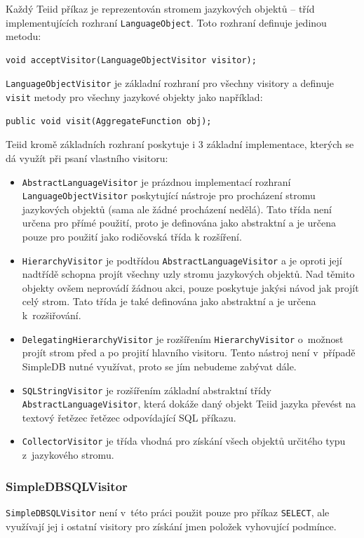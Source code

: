 \documentclass[oneside,12pt]{fithesis2}
\begin{document}
Každý Teiid příkaz je reprezentován stromem jazykových objektů -- tříd implementujících rozhraní \texttt{LanguageObject}. Toto rozhraní definuje jedinou metodu: 
\begin{Verbatim}[fontsize=\small]
void acceptVisitor(LanguageObjectVisitor visitor);
\end{Verbatim}
\texttt{LanguageObjectVisitor} je základní rozhraní pro všechny visitory a definuje \texttt{visit} metody pro všechny jazykové objekty jako například:
\begin{Verbatim}[fontsize=\small]
public void visit(AggregateFunction obj);
\end{Verbatim}
Teiid kromě základních rozhraní poskytuje i 3 základní implementace, kterých se dá využít při psaní vlastního visitoru:
\begin{itemize}
 \item \texttt{AbstractLanguageVisitor} je prázdnou implementací rozhraní \texttt{Language\allowbreak ObjectVisitor} poskytující nástroje pro procházení stromu jazykových objektů (sama ale žádné procházení nedělá). Tato třída není určena pro přímé použití, proto je definována jako abstraktní a je určena pouze pro použití jako rodičovská třída k rozšíření.
 \item \texttt{HierarchyVisitor} je podtřídou \texttt{AbstractLanguageVisitor} a je oproti její nadtřídě schopna projít všechny uzly stromu jazykových objektů. Nad těmito objekty ovšem neprovádí žádnou akci, pouze poskytuje jakýsi návod jak projít celý strom. Tato třída je také definována jako abstraktní a je určena k~rozšiřování.
 \item \texttt{DelegatingHierarchyVisitor} je rozšířením \texttt{HierarchyVisitor} o~možnost projít strom před a po projití hlavního visitoru. Tento nástroj není v~případě SimpleDB nutné využívat, proto se jím nebudeme zabývat dále.
 \item \texttt{SQLStringVisitor} je rozšířením základní abstraktní třídy \texttt{Abstract\allowbreak LanguageVisitor}, která dokáže daný objekt Teiid jazyka převést na textový řetězec řetězec odpovídající SQL příkazu.
 \item \texttt{CollectorVisitor} je třída vhodná pro získání všech objektů určitého typu z~jazykového stromu.
\end{itemize}

\subsubsection*{SimpleDBSQLVisitor}
\texttt{SimpleDBSQLVisitor} není v~této práci použit pouze pro příkaz \texttt{SELECT}, ale využívají jej i ostatní visitory pro získání jmen položek vyhovující podmínce. 
\end{document}
